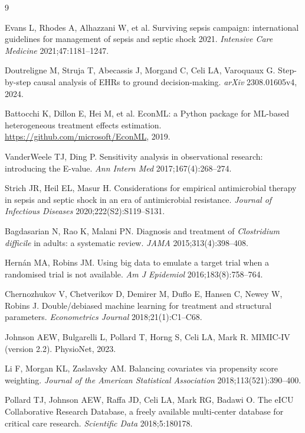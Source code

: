 \documentclass[11pt,a4paper]{article}
\begin{document}
\begin{thebibliography}{9}
\small

 Evans L, Rhodes A, Alhazzani W, et al.
Surviving sepsis campaign: international guidelines for management of sepsis and septic shock 2021.
\emph{Intensive Care Medicine} 2021;47:1181--1247.

 Doutreligne M, Struja T, Abecassis J, Morgand C, Celi LA, Varoquaux G.
Step-by-step causal analysis of EHRs to ground decision-making.
\emph{arXiv} 2308.01605v4, 2024.

 Battocchi K, Dillon E, Hei M, et al.
EconML: a Python package for ML-based heterogeneous treatment effects estimation.
\url{https://github.com/microsoft/EconML}, 2019.

 VanderWeele TJ, Ding P.
Sensitivity analysis in observational research: introducing the E-value.
\emph{Ann Intern Med} 2017;167(4):268--274.

 Strich JR, Heil EL, Masur H.
Considerations for empirical antimicrobial therapy in sepsis and septic shock in an era of antimicrobial resistance.
\emph{Journal of Infectious Diseases} 2020;222(S2):S119--S131.

 Bagdasarian N, Rao K, Malani PN.
Diagnosis and treatment of \emph{Clostridium difficile} in adults: a systematic review.
\emph{JAMA} 2015;313(4):398--408.

 Hern\'an MA, Robins JM.
Using big data to emulate a target trial when a randomised trial is not available.
\emph{Am J Epidemiol} 2016;183(8):758--764.

 Chernozhukov V, Chetverikov D, Demirer M, Duflo E, Hansen C, Newey W, Robins J.
Double/debiased machine learning for treatment and structural parameters.
\emph{Econometrics Journal} 2018;21(1):C1--C68.

 Johnson AEW, Bulgarelli L, Pollard T, Horng S, Celi LA, Mark R.
MIMIC-IV (version 2.2). PhysioNet, 2023.

 Li F, Morgan KL, Zaslavsky AM.
Balancing covariates via propensity score weighting.
\emph{Journal of the American Statistical Association} 2018;113(521):390--400.

 Pollard TJ, Johnson AEW, Raffa JD, Celi LA, Mark RG, Badawi O.
The eICU Collaborative Research Database, a freely available multi-center database for critical care research.
\emph{Scientific Data} 2018;5:180178.


\end{thebibliography}
\end{document}
